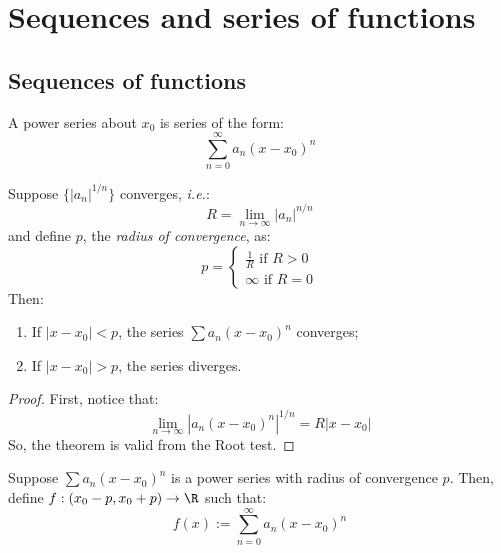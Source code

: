 \chapter{Sequences and series of functions}

\section{Sequences of functions}

\begin{definition}
    A power series about $x_0$ is series of the form:
    \begin{equation*}
        \sum \limits_{n = 0}^\infty a_n(x - x_0)^n
    \end{equation*}
\end{definition}

\begin{theorem}
    Suppose $\{|a_n|^{1/n}\}$ converges, \emph{i.e.}:
    \begin{equation*}
        R = \lim \limits_{n \to \infty} |a_n|^{n/n}
    \end{equation*}
    and define $p$, the \emph{radius of convergence}, as:
    \begin{equation*}
        p = \begin{cases}
            \frac{1}{R} \text{ if } R > 0 \\
            \infty \text{ if } R = 0
        \end{cases}
    \end{equation*}
    Then:
    \begin{enumerate}
        \item If $|x-x_0| < p$, the series $\sum a_n(x - x_0)^n$ converges;
        \item If $|x-x_0| > p$, the series diverges.
    \end{enumerate}
\end{theorem}

\begin{proof}
    First, notice that:
    \begin{equation*}
        \lim \limits_{n \to \infty} |a_n(x-x_0)^n|^{1/n} = R |x-x_0|
    \end{equation*}
    So, the theorem is valid from the Root test.
\end{proof}

Suppose $\sum a_n(x-x_0)^n$ is a power series with radius of convergence $p$. Then, define $f: (x_0 - p, x_0 + p) \to \R$ such that:
\begin{equation*}
    f(x) := \sum \limits_{n=0}^\infty a_n (x - x_0)^n
\end{equation*}

